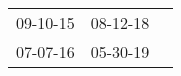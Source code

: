 \begin{supertabular}{p{0.33\columnwidth}p{0.33\columnwidth}p{0.33\columnwidth}}
 09-10-15\textsuperscript{} &  08-12-18\textsuperscript{} \\
 07-07-16\textsuperscript{} &  05-30-19\textsuperscript{} \\
\end{supertabular}
